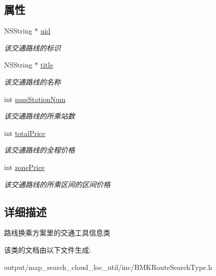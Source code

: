 \subsection*{属性}
\begin{DoxyCompactItemize}
\item 
\hypertarget{interface_b_m_k_vehicle_info_a17283dfe6370d707ab8a8260b5728428}{N\+S\+String $\ast$ \hyperlink{interface_b_m_k_vehicle_info_a17283dfe6370d707ab8a8260b5728428}{uid}}\label{interface_b_m_k_vehicle_info_a17283dfe6370d707ab8a8260b5728428}

\begin{DoxyCompactList}\small\item\em 该交通路线的标识 \end{DoxyCompactList}\item 
\hypertarget{interface_b_m_k_vehicle_info_ad188d1a1f9f87b507098f3190275964e}{N\+S\+String $\ast$ \hyperlink{interface_b_m_k_vehicle_info_ad188d1a1f9f87b507098f3190275964e}{title}}\label{interface_b_m_k_vehicle_info_ad188d1a1f9f87b507098f3190275964e}

\begin{DoxyCompactList}\small\item\em 该交通路线的名称 \end{DoxyCompactList}\item 
\hypertarget{interface_b_m_k_vehicle_info_a328104a4b6f915fe8654325ddd7de287}{int \hyperlink{interface_b_m_k_vehicle_info_a328104a4b6f915fe8654325ddd7de287}{pass\+Station\+Num}}\label{interface_b_m_k_vehicle_info_a328104a4b6f915fe8654325ddd7de287}

\begin{DoxyCompactList}\small\item\em 该交通路线的所乘站数 \end{DoxyCompactList}\item 
\hypertarget{interface_b_m_k_vehicle_info_a2167884d0d65e0f1bfa8b51215f31ba2}{int \hyperlink{interface_b_m_k_vehicle_info_a2167884d0d65e0f1bfa8b51215f31ba2}{total\+Price}}\label{interface_b_m_k_vehicle_info_a2167884d0d65e0f1bfa8b51215f31ba2}

\begin{DoxyCompactList}\small\item\em 该交通路线的全程价格 \end{DoxyCompactList}\item 
\hypertarget{interface_b_m_k_vehicle_info_ac880b4af4c7e2e9f622720e7488ef3c7}{int \hyperlink{interface_b_m_k_vehicle_info_ac880b4af4c7e2e9f622720e7488ef3c7}{zone\+Price}}\label{interface_b_m_k_vehicle_info_ac880b4af4c7e2e9f622720e7488ef3c7}

\begin{DoxyCompactList}\small\item\em 该交通路线的所乘区间的区间价格 \end{DoxyCompactList}\end{DoxyCompactItemize}


\subsection{详细描述}
路线换乘方案里的交通工具信息类 

该类的文档由以下文件生成\+:\begin{DoxyCompactItemize}
\item 
output/map\+\_\+search\+\_\+cloud\+\_\+loc\+\_\+util/inc/B\+M\+K\+Route\+Search\+Type.\+h\end{DoxyCompactItemize}
